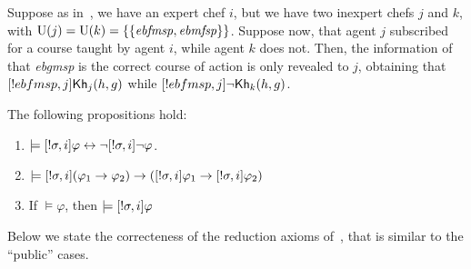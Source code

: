 \medskip 

\begin{example}
Suppose as in~, we have an expert chef $i$, but we have two inexpert chefs $j$ and $k$, with $\operatorname{U}(j)=\operatorname{U}(k)=\{ \{ \mathit{ebfmsp},\mathit{ebmfsp} \} \}$. Suppose now, that agent $j$ subscribed for a course taught by agent $i$, while agent $k$ does not. Then, the information of that \textit{ebgmsp} is the correct course of action is only revealed to $j$, obtaining that $[!ebfmsp,j]{\sf Kh}_j(h,g)$ while $[!ebfmsp,j]\neg{\sf Kh}_k(h,g)$.
\end{example}

\medskip 

\begin{proposition} The following propositions hold:
\begin{enumerate}
\item $\models [!\sigma,i]\varphi \leftrightarrow \neg[!\sigma,i]\neg\varphi$. 
\item $\models [!\sigma,i](\varphi_1 \rightarrow \varphi_2) \rightarrow ([!\sigma,i]\varphi_1 \rightarrow [!\sigma,i]\varphi_2)$
\item If $\models \varphi$, then $\models [!\sigma,i]\varphi$
\end{enumerate}
\end{proposition}

\medskip 

Below we state the correcteness of the reduction axioms of~, that is similar to the ``public'' cases. 

\medskip 


